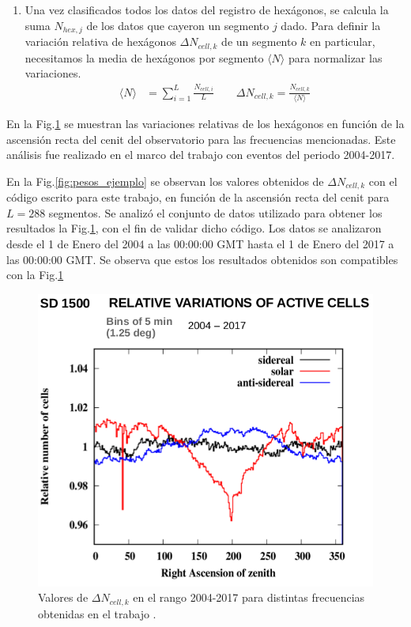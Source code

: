 \begin{enumerate}
        \item Una vez clasificados todos los datos del registro de hexágonos, se calcula la suma  $N_{hex, j}$ de los datos que cayeron un segmento $j$ dado. Para definir la variación relativa de hexágonos  $\Delta N_{cell,k}$ de un segmento $k$ en particular, necesitamos la media de hexágonos por segmento $ \langle N \rangle$  para normalizar las variaciones.
       \begin{align}
         \langle N \rangle &= \sum^{L}_{i=1} \frac{N_{cell, i}}{L}  \qquad
         \Delta N_{cell,k} = \frac{N_{cell, k}}{\langle N \rangle}  \label{epepe}
       \end{align}

      \end{enumerate}
 En la Fig.\ref{fig:pesos_referencia} se muestran las variaciones relativas de los hexágonos en función de la ascensión recta del cenit del observatorio para las frecuencias mencionadas. Este análisis fue realizado en el marco del trabajo \cite{referencia_pesos} con eventos del periodo 2004-2017. 



       En la Fig.\ref{fig:pesos_ejemplo} se observan los valores obtenidos de $\Delta N_{cell,k}$  con el código escrito para este trabajo, en función de la ascensión recta del cenit  para $L=288$ segmentos. Se analizó el conjunto de datos  utilizado para obtener los resultados la Fig.\ref{fig:pesos_referencia}, con el fin de validar dicho código. Los datos se analizaron desde el 1 de Enero del 2004 a las 00:00:00 GMT  hasta el 1 de Enero del 2017 a las 00:00:00 GMT. Se  observa que estos los resultados obtenidos son compatibles con la Fig.\ref{fig:pesos_referencia}
      
      \begin{figure}[H]
          \centering
              \includegraphics[width=0.5\linewidth]{pesos_referencia.png}  
              \caption{Valores de $\Delta N_{cell, k}$ en el rango 2004-2017 para distintas frecuencias obtenidas en el trabajo \cite{referencia_pesos}.}
              \label{fig:pesos_referencia}
        \end{figure}

